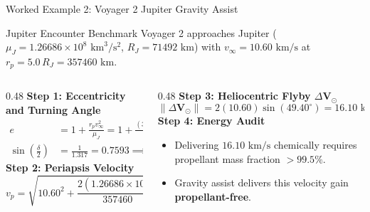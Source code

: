 \documentclass[aspectratio=169, 10pt]{beamer}
\begin{document}
\begin{frame}{Worked Example 2: Voyager 2 Jupiter Gravity Assist}
    \begin{exampleblock}{Jupiter Encounter Benchmark}
        \scriptsize
        Voyager 2 approaches Jupiter ($\mu_J = 1.26686 \times 10^8\text{ km}^3/\text{s}^2$, $R_J = 71492\text{ km}$) with $v_\infty = 10.60\text{ km/s}$ at $r_p = 5.0\,R_J = 357460\text{ km}$.
    \end{exampleblock}

    \vspace{-0.15cm}

    \begin{columns}[t]
        \begin{column}{0.48\textwidth}
            \scriptsize
            \textbf{Step 1: Eccentricity and Turning Angle}
            \begin{align*}
                e &= 1 + \frac{r_p v_\infty^2}{\mu_J} = 1 + \frac{(357460)(10.60)^2}{1.26686 \times 10^8} = 1.317 \\
                \sin\left(\frac{\delta}{2}\right) &= \frac{1}{1.317} = 0.7593 \implies \delta_{\text{turn}} = \mathbf{98.81}^\circ
            \end{align*}
            \vspace{-0.15cm}
            \textbf{Step 2: Periapsis Velocity}
            \begin{equation*}
                v_p = \sqrt{10.60^2 + \frac{2(1.26686 \times 10^8)}{357460}} = \mathbf{28.65}\text{ km/s}
            \end{equation*}
        \end{column}

        \begin{column}{0.48\textwidth}
            \scriptsize
            \textbf{Step 3: Heliocentric Flyby $\Delta \mathbf{V}_\odot$}
            \begin{equation*}
                \|\Delta \mathbf{V}_{\odot}\| = 2(10.60)\sin(49.40^\circ) = \mathbf{16.10}\text{ km/s}
            \end{equation*}
            \textbf{Step 4: Energy Audit}
            \begin{itemize}\setlength{\itemsep}{1pt}
                \item Delivering $16.10\text{ km/s}$ chemically requires propellant mass fraction $>99.5\%$.
                \item Gravity assist delivers this velocity gain \textbf{propellant-free}.
            \end{itemize}
        \end{column}
    \end{columns}
\end{frame}
\end{document}

